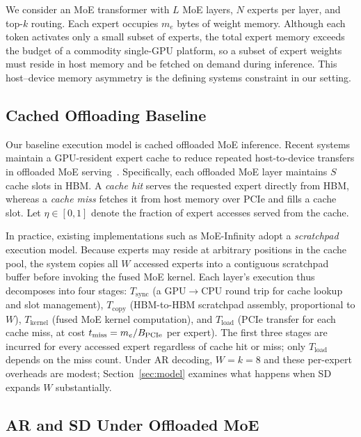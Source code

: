 We consider an MoE transformer with $L$ MoE layers, $N$ experts per layer, and top-$k$ routing. Each expert occupies $m_e$ bytes of weight memory. Although each token activates only a small subset of experts, the total expert memory exceeds the budget of a commodity single-GPU platform, so a subset of expert weights must reside in host memory and be fetched on demand during inference. This host--device memory asymmetry is the defining systems constraint in our setting.

\subsection{Cached Offloading Baseline}
\label{subsec:cached}

Our baseline execution model is cached offloaded MoE inference. Recent systems maintain a GPU-resident expert cache to reduce repeated host-to-device transfers in offloaded MoE serving~\cite{xue2024moeinfinity,eliseev2023fast,hwang2023pregated}. Specifically, each offloaded MoE layer maintains $S$ cache slots in HBM. A \emph{cache hit} serves the requested expert directly from HBM, whereas a \emph{cache miss} fetches it from host memory over PCIe and fills a cache slot. Let $\eta \in [0,1]$ denote the fraction of expert accesses served from the cache.

In practice, existing implementations such as MoE-Infinity adopt a \emph{scratchpad} execution model. Because experts may reside at arbitrary positions in the cache pool, the system copies all $W$ accessed experts into a contiguous scratchpad buffer before invoking the fused MoE kernel. Each layer's execution thus decomposes into four stages: $T_{\mathrm{sync}}$ (a GPU$\to$CPU round trip for cache lookup and slot management), $T_{\mathrm{copy}}$ (HBM-to-HBM scratchpad assembly, proportional to $W$), $T_{\mathrm{kernel}}$ (fused MoE kernel computation), and $T_{\mathrm{load}}$ (PCIe transfer for each cache miss, at cost $t_{\mathrm{miss}} = m_e / B_{\mathrm{PCIe}}$ per expert). The first three stages are incurred for every accessed expert regardless of cache hit or miss; only $T_{\mathrm{load}}$ depends on the miss count. Under AR decoding, $W = k = 8$ and these per-expert overheads are modest; Section~\ref{sec:model} examines what happens when SD expands $W$ substantially.

\subsection{AR and SD Under Offloaded MoE}

